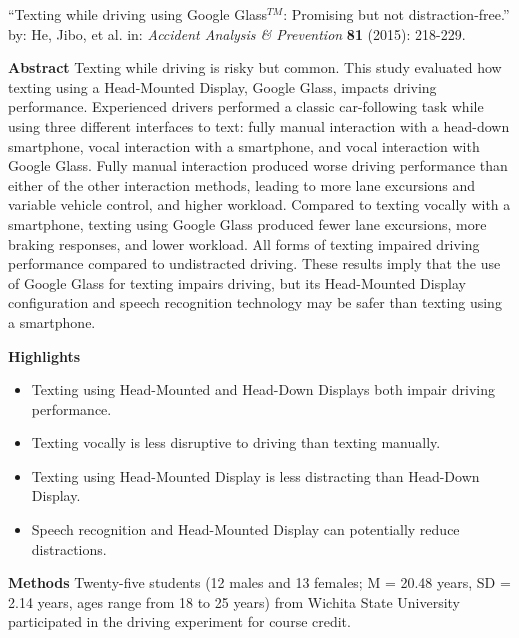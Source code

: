 \begin{alist}
\item ``Texting while driving using Google Glass$^{TM}$: Promising but not
  distraction-free.'' by: He, Jibo, et al. in: {\it Accident Analysis
    \& Prevention} {\bf 81} (2015): 218-229.\\
  \begin{list}{}{}
  \item [\bf Abstract] Texting while driving is risky but common. This
    study evaluated how texting using a Head-Mounted Display, Google
    Glass, impacts driving performance. Experienced drivers performed
    a classic car-following task while using three different
    interfaces to text: fully manual interaction with a head-down
    smartphone, vocal interaction with a smartphone, and vocal
    interaction with Google Glass. Fully manual interaction produced
    worse driving performance than either of the other interaction
    methods, leading to more lane excursions and variable vehicle
    control, and higher workload. Compared to texting vocally with a
    smartphone, texting using Google Glass produced fewer lane
    excursions, more braking responses, and lower workload. All forms
    of texting impaired driving performance compared to undistracted
    driving. These results imply that the use of Google Glass for
    texting impairs driving, but its Head-Mounted Display
    configuration and speech recognition technology may be safer than
    texting using a smartphone.
  \item [\bf Highlights]
    \begin{itemize}
    \item Texting using Head-Mounted and Head-Down Displays both
      impair driving performance.
    \item Texting vocally is less disruptive to driving than texting manually.
    \item Texting using Head-Mounted Display is less distracting than Head-Down Display.
    \item Speech recognition and Head-Mounted Display can potentially reduce distractions.
    \end{itemize}
  \item [\bf Methods] Twenty-five students (12 males and 13 females; M
    = 20.48 years, SD = 2.14 years, ages range from 18 to 25 years)
    from Wichita State University participated in the driving
    experiment for course credit.
  

\end{list}
\end{alist}

